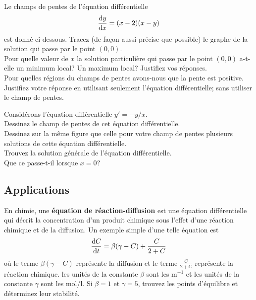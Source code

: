 \begin{question}
Le champs de pentes de l'équation différentielle
\[
\frac{\mathrm{d}y}{\mathrm{d}x} = (x-2)(x-y)
\]
est donné ci-dessous.
 Tracez (de façon aussi précise que possible) le graphe de la
solution qui passe par le point $(0,0)$.\\
 Pour quelle valeur de $x$ la solution particulière qui passe
par le point $(0,0)$ a-t-elle un minimum local?  Un maximum local?
Justifiez vos réponses.\\ 
 Pour quelles régions du champs de pentes avons-nous que la pente est
positive.  Justifiez votre réponse en utilisant seulement
l'équation différentielle; sans utiliser le champ de pentes.
\label{10Q46}
\end{question}

\begin{question}
Considérons l'équation différentielle  $y' = -y/x$.\\
 Dessinez le champ de pentes de cet équation différentielle.\\
 Dessinez sur la même figure que celle pour votre champ de
pentes plusieurs solutions de cette équation différentielle.\\ 
 Trouvez la solution générale de l'équation différentielle.\\
 Que ce passe-t-il lorsque $x = 0$?
\label{10Q47}
\end{question}

\subsection{Applications}

\begin{question}[\eng]
En chimie, une {\bfseries équation de
  réaction-diffusion}  est une
équation différentielle qui décrit la concentration d'un produit
chimique sous l'effet d'une réaction chimique et de la diffusion.  Un
exemple simple d'une telle équation est
\[
\frac{\mathrm{d}C}{\mathrm{d}t} = \beta(\gamma-C) + \frac{C}{2+C}
\]
où le terme $\beta(\gamma-C)$ représente la diffusion et le terme
$\displaystyle \frac{C}{2+C}$ représente la réaction chimique.
les unités de la constante $\beta$ sont les m$^{-1}$ et les unités de la
constante $\gamma$ sont les mol/l.  Si $\beta=1$ et $\gamma=5$, trouvez les
points d'équilibre et déterminez leur stabilité.
\label{10Q48}
\end{question}

